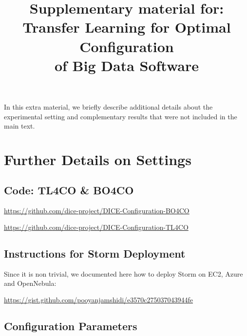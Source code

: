 \documentclass[letter]{vldb}
\begin{document}
\title{Supplementary material for: \\ Transfer Learning for Optimal Configuration \\ of Big Data Software}
\maketitle


In this extra material, we briefly describe additional details about the experimental setting and complementary results that were not included in the main text. 

\section{Further Details on Settings}

\subsection{Code: {\sf \large TL4CO} \& {\sf \large BO4CO}}

{\noindent \small \url{https://github.com/dice-project/DICE-Configuration-BO4CO}}

{\noindent \small \url{https://github.com/dice-project/DICE-Configuration-TL4CO}}


\subsection{Instructions for Storm Deployment}
Since it is non trivial, we documented here how to deploy Storm on EC2, Azure and OpenNebula:

{\noindent \small \url{https://gist.github.com/pooyanjamshidi/e3570c275037043944fe}}




\subsection{Configuration Parameters}
\end{document}
